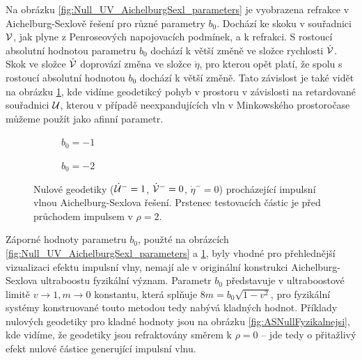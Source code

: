 Na obrázku \ref{fig:Null_UV_AichelburgSexl_parameters} je vyobrazena refrakce v Aichelburg-Sexlově řešení pro různé
parametry $b_0$. Dochází ke skoku v souřadnici $\mathcal{V}$, jak plyne z Penroseových napojovacích podmínek, a k refrakci.
S rostoucí absolutní hodnotou parametru $b_0$ dochází k větší změně ve složce rychlosti $\dot {\mathcal{V}}$.
Skok ve složce $\dot {\mathcal{V}}$ doprovází změna ve složce $\dot \eta$, pro kterou opět platí, že spolu s
rostoucí absolutní hodnotou $b_0$ dochází k větší změně. Tato závislost je také vidět na obrázku \ref{fig:NullASRing01},
kde vidíme geodetikcý pohyb v prostoru v závislosti na retardované souřadnici $\mathcal{U}$, kterou v případě neexpandujících vln
v Minkowského prostoročase můžeme použít jako afinní parametr.

\begin{figure}[h]
    \centering
    \begin{subfigure}[b]{0.45\textwidth}
        \caption{$b_0 = -1$}
    \end{subfigure}
    \hfill
    \begin{subfigure}[b]{0.45\textwidth}
        \caption{$b_0 = -2$}
    \end{subfigure}
    \caption{Nulové geodetiky ($\dot {\mathcal{U}}^-=1$, $\dot {\mathcal{V}}^-=0$, $\dot \eta^-=0$) procházející impulsní vlnou Aichelburg-Sexlova řešení. Prstenec testovacích částic je před průchodem impulsem v $\rho=2$.}
    \label{fig:NullASRing01}
\end{figure}

Záporné hodnoty parametru $b_0$, použté na obrázcích \ref{fig:Null_UV_AichelburgSexl_parameters} a \ref{fig:NullASRing01}, byly vhodné pro přehlednější vizualizaci
efektu impulsní vlny, nemají ale v originální konstrukci Aichelburg-Sexlova ultraboostu fyzikální význam. Parametr $b_0$
představuje v ultraboostové limitě $v \to 1, m \to 0$ konstantu, která splňuje $8m = b_0\sqrt{1-v^2}$, pro fyzikální systémy konstruované touto metodou
tedy nabývá kladných hodnot. Příklady nulových geodetiky pro kladné hodnoty jsou na obrázku \ref{fig:ASNullFyzikalnejsi}, kde vidíme,
že geodetiky jsou refraktovány směrem k $\rho=0$ -- jde tedy o přitažlivý efekt nulové částice generující impulsní vlnu.

